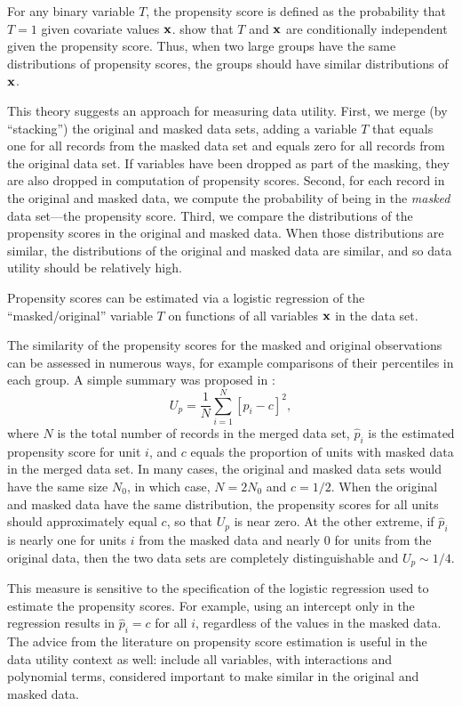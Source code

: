 For any binary variable $T$, the propensity
score is defined as the probability that $T=1$ given covariate values $\textbf{x}$. \cite{rr83} show
that $T$ and $\textbf{x}$ are conditionally independent given the propensity
score. Thus, when two large groups have the same distributions of
propensity scores, the groups should have similar distributions of $\textbf{x}$.

This theory suggests an approach for measuring data utility.
First, we merge (by ``stacking'') the original and masked data sets, adding a variable $T$ that equals one for all records from the masked data set and equals zero for all records from the original data set. If
variables have been dropped as part of the masking, they are also
dropped in computation of propensity scores.  Second, for each record
in the original and masked data, we compute the probability of being
in the \textit{masked} data set---the propensity
score. Third, we compare the distributions of the propensity scores in
the original and masked data.  When those distributions are similar,
the distributions of the original and masked data are similar, and so
data utility should be relatively high.

Propensity scores can be estimated via a logistic regression of the
``masked/original'' variable $T$ on functions of all variables $\textbf{x}$
in the data set.  

The similarity of the propensity scores for the masked and original
observations can be assessed in numerous ways, for example comparisons
of their percentiles in each group.  A simple summary was proposed in \cite{propen}:
\begin{equation}
U_p =  \frac{1}{N} \sum_{i=1}^{N}\left[\hat{p}_i-c\right]^2,
\end{equation}
where $N$ is the total number of records in the merged data set,
$\hat{p}_i$ is the estimated propensity score for unit $i$, and $c$
equals the proportion of units with masked data in the merged data
set. In many cases, the original and masked data sets would have the
same size $N_0$, in which case, $N = 2N_0$ and $c = 1/2$. When the
original and masked data have the same distribution, the propensity
scores for all units should approximately equal $c$, so that $U_p$ is
near zero. At the other extreme, if $\hat{p}_i$ is nearly one for
units $i$ from the masked data and nearly 0 for units from the
original data, then the two data sets are completely distinguishable
and $U_p \sim 1/4$.


This measure is sensitive to the specification of the logistic
regression used to estimate the propensity scores.  For example, using
an intercept only in the regression results in $\hat{p}_i = c$ for all
$i$, regardless of the values in the masked data.  The advice from the
literature on propensity score estimation is
useful in the data utility context as well: include all variables,
with interactions and polynomial terms, considered important to make
similar in the original and masked data.

